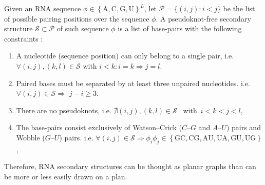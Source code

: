 \begin{mydef}
	\label{def:rna_structure}	
	
	Given an \ac{RNA} sequence $\phi \in \left\{\text{A},\text{C},\text{G},\text{U}\right\}^L$, let $\mathcal{P}=\big \{(i,j) \colon i<j \big \}$ be the list of possible pairing positions over the sequence $\phi$. A pseudoknot-free secondary structure $ \mathcal{S}\subset \mathcal{P} $ of such sequence $\phi$ is a list of base-pairs  with the following constraints \cite{hofacker_rna_2005,hofacker_rna_2006}:
	\begin{enumerate}
		\item A nucleotide (sequence position) can only belong to a single pair, i.e. $\forall (i,j), (k,l) \in \mathcal{S}$ with $i<k \colon i=k \Rightarrow j=l$.
		\item Paired bases must be separated by at least three
		unpaired nucleotides. i.e. \(\forall (i,j) \in \mathcal{S} \Rightarrow \) \(j-i\geq3\).
		\item There are no pseudoknots, i.e. $ \nexists \left(i,j\right), \left(k,l\right) \in \mathcal{S}$
		~with~\(i<k<j<l\),
		\item The base-pairs consist exclusively of Watson–Crick ($C–G$ and $A–U$) pairs and Wobble ($G–U$) pairs. i.e. $\forall \left(i,j\right) \in \mathcal{S}\Rightarrow \phi_i\phi_j \in \left\{\text{GC},\text{CG},\text{AU},\text{UA},\text{GU},\text{UG}\right\}$,
	\end{enumerate}
	
	Therefore, \ac{RNA} secondary structures can be thought as planar graphs than can be more or less easily drawn on a plan. 
\end{mydef}
